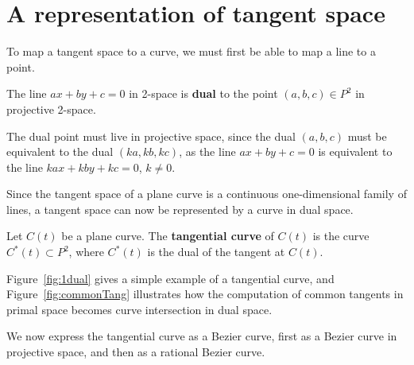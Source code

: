 \documentclass[9pt,twocolumn]{article}
\newif\ifVideo
\newif\ifTalk
\newcommand{\plucker}{Pl\"{u}cker\ }
\begin{document}
\ifVideo
  video: single curve and its dual (ob2.rawctr)
       tangent moving on curve with associated point moving on dual
\fi
\ifTalk
This is analogous to the appeal
of using the Fourier transform to shift to the frequency domain,
where the difficult operation of convolution 
becomes the simple operation of multiplication.
\fi
\ifVideo
  video: two curves in left window, their duals in right window:
       point moving on one of the dual curves with associated tangent
       moving on original curve, illustrating that as point nears intersection
       the tangent nears common tangency
\fi



\section{A representation of tangent space}
\label{sec:dual}

To map a tangent space to a curve, we must first be able to map a line to a point.

\begin{defn2}
\label{defn:dual}
The line $ax+by+c=0$ in 2-space is {\bf dual} to the point $(a,b,c) \in P^2$
in projective 2-space.
\end{defn2}
%
The dual point must live in projective space,
since the dual $(a,b,c)$ must be equivalent to the dual $(ka,kb,kc)$,
as the line $ax + by + c = 0$ is equivalent to the line
$kax + kby + kc = 0$, $k \neq 0$.

Since the tangent space of a plane curve is a continuous one-dimensional family 
of lines, a tangent space can now be represented by a curve in dual space.

\begin{defn2}
\label{defn:tangentialcurve}
Let $C(t)$ be a plane curve.
The {\bf tangential curve} of $C(t)$ is the curve $C^*(t) \subset P^2$,
where $C^*(t)$ is the dual of the tangent at $C(t)$.
\end{defn2}
%
Figure~\ref{fig:1dual} gives a simple example of a tangential curve, and
Figure~\ref{fig:commonTang} illustrates how the computation of 
common tangents in primal space becomes curve intersection in dual space.

We now express the tangential curve as a Bezier curve, 
first as a Bezier curve in projective space, and then as a rational Bezier curve.
\end{document}
